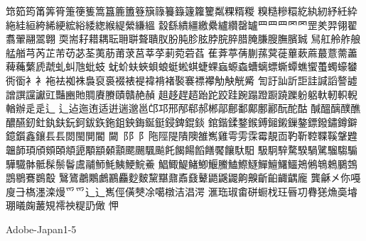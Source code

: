 筇筎筠筩筭筲箑箯篗篙簋簏簠簦簱簶籑籙籧籮籰粼粿糈糉
糗糙糝糫紇紈紉紓紝紣絁絓絙絝絺綆綋綌緌緫緱緹縈縑縕
縠繇繢繮繳纍纑纘罄罏⺫⺲罒⺱罓罡羑羿翎翟翥翬翮翯翺
耎耑耔耤耦耺耼聠聱聵肞肦肫胗胘脖脘脺腊腌膁膄膴臏臹
舃舡舲舴艆艋艏芎芮芷芾苆苾荃荑荕莆莍莒莘莩莿菀菪萏
萑葊葶蒨蒯蓀蓂蓰蓽蔌蔴蕞薏薷藎薭蘒蘩虒虣虬虯虺蚍蚑
蚘蚧蚨蛺蛽蜋蜓蜙蜞蜨蜾蝱螈螙螬螭螵蟖蟫蟭蠁蠆蠋蠔蠜
衖衟⻂衤袘袪袽袾裊裒裛裰裱褆褘褙褚褧褰褾襻觔觖觥觱
訇訏訕訢詎詿諴謟謷譃譄譔讜讞豇豔豳貤賙賡賸賾贛赩赬
趄趍趕趦跆跎跤跬踠蹋蹬蹰蹺躒躮躳軑軔軹輗輶辦⾡辵⻍
辶迠迤迶适逬遄邈邕邙邛邢邴郗郝郴鄗鄜鄱鄺鄽酈酛酡酤
醎醞醨醭醮醲醼釰釷釻鈇鈨鈳鈸鉃鉇鉏鉠鋂鋋鋌鋟錍錕錟
錧鍇鍒鍪鍭鎛鎺鎩鏁鏊鏢鏺鏽鐏鐴鐿鑕鑫鑲⻒镸閦閩閴閽
闚⻏⻖阝陁陘隄隤隩雒嶲雞雩雱霂霉靚靣靮靳鞚鞢鞵鞶韙
韞韴頊頎頞頣頫頾顒顓顙顬颸颺颿飈飥餲餳饀饍饜饟馱馹
馺駉騂騖騤騧騭騮騶騸驊驖骵骶髹鬃鬠鬳鬴魳魹鮧鯁鯇鯗
鯧鯫鯷鯺鯽鰋鰧鰪鰶鱁鱓鱣鱰鱷鴂鵂鵇鵣鵩鵼鵾鶍鶱鷃鷇
鷖鷟鷫鷴鸕鸝麤麨麬黧黮鼐鼒鼗鼙鼯鼷鼹齁齅齗齨齱齵龐
龔龢㐅你嘠廋⺕𣘺濹滦熳⺤爫⻌辶嶲俓僙僰凃噶橔洁淐湂
滙珤琡畬硑蟵𣏾玨㫳㓛䐌㺊龽䯨龼㻚㬢龾䕺䂓䙥䄃䊓䚮㒈
𢘉

Adobe-Japan1-5

